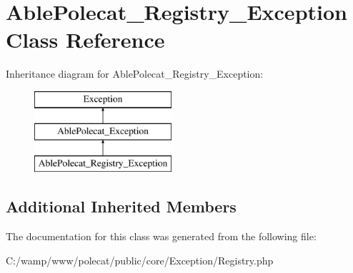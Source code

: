 \hypertarget{class_able_polecat___registry___exception}{}\section{Able\+Polecat\+\_\+\+Registry\+\_\+\+Exception Class Reference}
\label{class_able_polecat___registry___exception}
Inheritance diagram for Able\+Polecat\+\_\+\+Registry\+\_\+\+Exception\+:\begin{figure}[H]
\begin{center}
\leavevmode
\includegraphics[height=3.000000cm]{class_able_polecat___registry___exception}
\end{center}
\end{figure}
\subsection*{Additional Inherited Members}


The documentation for this class was generated from the following file\+:\begin{DoxyCompactItemize}
\item 
C\+:/wamp/www/polecat/public/core/\+Exception/Registry.\+php\end{DoxyCompactItemize}
